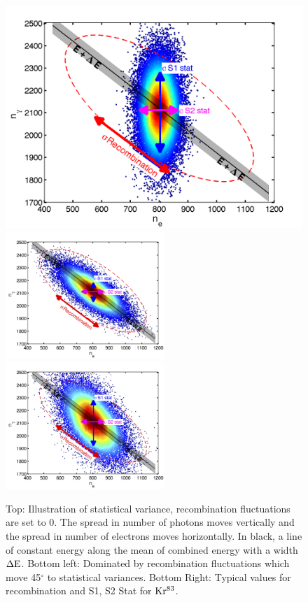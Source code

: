  \begin{figure}[h!]\centering
\includegraphics[width=130mm]{Chapter_Flucs/Figures/EX_Stat_Fano.png}
\includegraphics[width=60mm]{Chapter_Flucs/Figures/EX_R_Fano.png}
\includegraphics[width=60mm]{Chapter_Flucs/Figures/EX_Kr_Fano.png}
\caption{Top: Illustration of statistical variance, recombination fluctuations are set to 0. The spread in number of photons moves vertically and the spread in number of electrons moves horizontally. In black, a line of constant energy along the mean of combined energy with a width $\rm \Delta E$. Bottom left: Dominated by recombination fluctuations which move 45$^{\circ}$ to statistical variances. Bottom Right: Typical values for recombination and  S1, S2 Stat for $\rm Kr^{83}$. }
\label{fig:Recomb}
\end{figure}


